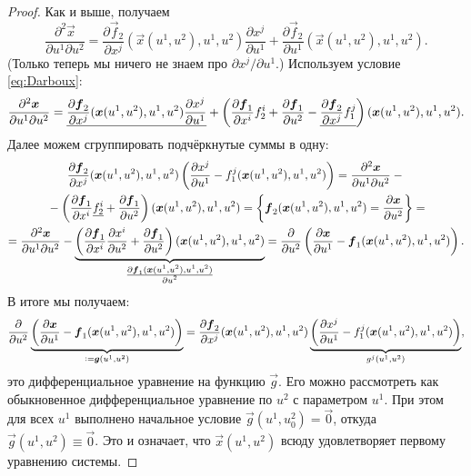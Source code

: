 \begin{proof}
	Как и выше, получаем
	\[
		\frac{\partial^2\vec{x}}{\partial u^1\partial u^2} = \frac{\partial\vec{f}_2}{\partial x^j}(\vec{x}(u^1, u^2), u^1, u^2)\frac{\partial x^j}{\partial u^1} + \frac{\partial\vec{f}_2}{\partial u^1}(\vec{x}(u^1, u^2), u^1, u^2).
	\]
	(Только теперь мы ничего не знаем про $\partial x^j / \partial u^1$.) Используем условие \eqref{eq:Darboux}:
	\[
		\frac{\partial^2\boldsymbol{x}}{\partial u^1\partial u^2} = \underline{\frac{\partial\boldsymbol{f}_2}{\partial x^j}(\boldsymbol{x}(u^1, u^2), u^1, u^2)\frac{\partial x^j}{\partial u^1}} + \left(\frac{\partial\boldsymbol{f}_1}{\partial x^i}f_2^i + \frac{\partial\boldsymbol{f}_1}{\partial u^2} - \underline{\frac{\partial\boldsymbol{f}_2}{\partial x^j}f_1^j}\right)(\boldsymbol{x}(u^1, u^2), u^1, u^2).
	\]
	Далее можем сгруппировать подчёркнутые суммы в одну:
	\begin{multline*}
		\frac{\partial\boldsymbol{f}_2}{\partial x^j}(\boldsymbol{x}(u^1, u^2), u^1, u^2)\left(\frac{\partial x^j}{\partial u^1} - f_1^j(\boldsymbol{x}(u^1, u^2), u^1, u^2)\right) = \frac{\partial^2\boldsymbol{x}}{\partial u^1\partial u^2} - {}\\{} - \left(\frac{\partial\boldsymbol{f}_1}{\partial x^i}\underline{f_2^i} + \frac{\partial\boldsymbol{f}_1}{\partial u^2}\right)(\boldsymbol{x}(u^1, u^2), u^1, u^2) = \left\{\boldsymbol{f}_2(\boldsymbol{x}(u^1, u^2), u^1, u^2) = \frac{\partial\boldsymbol{x}}{\partial u^2}\right\} =\\ = \frac{\partial^2\boldsymbol{x}}{\partial u^1\partial u^2} - {\underbrace{\left(\frac{\partial\boldsymbol{f}_1}{\partial x^i}\frac{\partial x^i}{\partial u^2} + \frac{\partial\boldsymbol{f}_1}{\partial u^2}\right)(\boldsymbol{x}(u^1, u^2), u^1, u^2)}_{\frac{\scriptstyle\partial\boldsymbol{f}_1(\boldsymbol{x}(u^1, u^2), u^1, u^2)}{\scriptstyle\partial u^2}}} = \frac{\partial}{\partial u^2}\left(\frac{\partial\boldsymbol{x}}{\partial u^1} - \boldsymbol{f}_1(\boldsymbol{x}(u^1, u^2), u^1, u^2)\right).
	\end{multline*}
	В итоге мы получаем:
	\[
		\frac{\partial}{\partial u^2}\underbrace{\left(\frac{\partial\boldsymbol{x}}{\partial u^1} - \boldsymbol{f}_1(\boldsymbol{x}(u^1, u^2), u^1, u^2)\right)}_{{} \vcentcolon = \boldsymbol{g}(u^1, u^2)} = \frac{\partial\boldsymbol{f}_2}{\partial x^j}(\boldsymbol{x}(u^1, u^2), u^1, u^2)\underbrace{\left(\frac{\partial x^j}{\partial u^1} - f_1^j(\boldsymbol{x}(u^1, u^2), u^1, u^2)\right)}_{g^j(u^1, u^2)},
	\]
	это дифференциальное уравнение на функцию $\vec{g}$. Его можно рассмотреть как обыкновенное дифференциальное уравнение по $u^2$ с параметром $u^1$. При этом для всех $u^1$ выполнено начальное условие $\vec{g}(u^1, u^2_0) = \vec{0}$, откуда $\vec{g}(u^1, u^2) \equiv \vec{0}$. Это и означает, что $\vec{x}(u^1, u^2)$ всюду удовлетворяет первому уравнению системы.
\end{proof}

